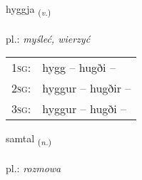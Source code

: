 \documentclass[frontgrid, backgrid]{flacards}\usepackage[]{graphicx}\usepackage[]{xcolor}
\begin{document}
\renewcommand{\blhead}{\vskip5pt {\small\bfseries\footnotesize Sagnorð | Verb }}
\renewcommand{\bcfoot}{\vskip5pt \hspace{2pt}{\small\bfseries\footnotesize 2K}}


{hyggja \small{\textsubscript{(\textit{v.})}} \\[1ex] %
\textphonetic{[hɪca]} \\
pl.: \emph{myśleć, wierzyć} \\  [2ex]
\renewcommand*{\arraystretch}{0.8}
\begin{tabular}{p{1cm}l}
\textsc{1sg}: & hygg -- hugði --  \\ 
\textsc{2sg}: & hyggur -- hugðir --  \\ 
\textsc{3sg}: & hyggur -- hugði --  \\ 
\end{tabular}
}

\renewcommand{\flhead}{\vskip5pt \fboxsep=0pt {\small\bfseries\footnotesize Nafnorð | Noun}}
\renewcommand{\fcfoot}{\vskip5pt \fboxsep=0pt \hspace{2pt}{\small\bfseries\footnotesize 2K}}

\renewcommand{\blhead}{\vskip5pt {\small\bfseries\footnotesize Nafnorð | Noun }}
\renewcommand{\bcfoot}{\vskip5pt \hspace{2pt}{\small\bfseries\footnotesize 2K}}


{samtal \small{\textsubscript{(\textit{n.})}} \\[1ex] %
\textphonetic{[samtʰal]} \\
pl.: \emph{rozmowa} \\  [2ex]
\renewcommand*{\arraystretch}{0.8}
}

\renewcommand{\flhead}{\vskip5pt \fboxsep=0pt {\small\bfseries\footnotesize Nafnorð | Noun}}
\renewcommand{\fcfoot}{\vskip5pt \fboxsep=0pt \hspace{2pt}{\small\bfseries\footnotesize 2K}}
\end{document}
